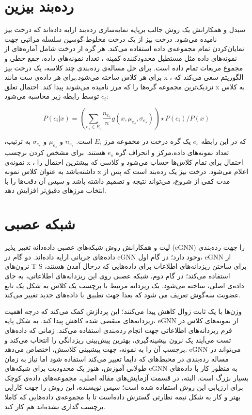 \section{رده‌بند بیزین}

سیدل
و همکارانش \cite{seidl2009indexing} یک روش جالب برپایه نمایه‌سازی
رده‌بند ارایه داده‌اند که درخت بیز نامیده می‌شود. درخت بیز از یک درخت مخلوط-گوسین سلسله مراتبی
جهت نمایان‌کردن تمام مجموعه‌ی داده استفاده می‌کند. هر گره از درخت شامل آماره‌های از نمونه‌های داده مثل مستطیل محدود‌کننده کمینه
، تعداد نمونه‌های داده، جمع خطی و مجموع مربعات تمام داده است.
برای حل مساله‌ی رده‌بندی چند کلاسه، یک درخت بیز برای هر کلاس ساخته‌ می‌شود.برای هر داده‌ی ست مانند x    ، الگوریتم سعی می‌کند که نزدیک‌ترین مجموعه گره‌ها را که مرز نامیده می‌شوند پیدا کند. احتمال تعلق x به کلاس $c_i$ توسط رابطه زیر محاسبه می‌شود:

$$
P(c_i | x ) = 
\left(       
\sum_{e_s \in E_i} \frac{n_{e_s}}{n}
g(x, \mu_{e_s}, \sigma_{e_s})
\right)
\star P(c_i)/P(x)
$$


که در این رابطه $e_s$ یک گره درخت در مخموعه مرز $E_i$ است. $n_{e_s}$ و $ \mu_{e_s}$ و $\sigma_{e_s}$ به ترتیب، تعداد نمونه‌های داده،‌مرکز و انحراف گره $e_s$ هستند. برای مشخص کردن برچسب نمونه‌ی x ، احتمال برای تمام کلاس‌ها حساب می‌شود و کلاسی که بیشترین احتمال را داشته‌باشد به عنوان کلاس نمونه x اعلام می‌شود. درخت بیز یک رده‌بند است که پس از مدت کمی از شروع، می‌تواند نتیجه و تصمیم داشته باشد و سپس آن دقت‌ها را با انتخاب مرز‌های دقیق‌تر افزایش دهد.


\section{شبکه عصبی}
لیت
و همکارانش \cite{leite2010evolving} روش شبکه‌های عصبی داده‌دانه تغییر پذیر
(eGNN)
را جهت رده‌بندی داده‌های جریانی ارایه داده‌اند. دو گام در eGNN وجود دارد؛ در گام اول، eGNN از نرون‌های T-S برای ساختن ریزدانه‌های اطلاعات برای داده‌هایی که درحال آمدن هستند، استفاده می‌کند؛ در گام دوم، شبکه عصبی روی این ریزدانه‌های اطلاعاتی، به جای داده‌ی اصلی، ساخته می‌شود. یک ریزدانه مرتبط با برچسب یک کلاس به شکل یک تابع عضویت سه‌گوش
 تعریف می شود که بعدا جهت تطبیق با داده‌های جدید تغییر می‌کند.
 
  وزن‌ها با یک ثابت زوال
کاهش پیدا می‌کنند؛ این پردازش کمک می‌کند که درجه اهمیت ریزدانه‌های منقضی شده کاهش پیدا کند. به شکل پایه، eGNN از نمونه‌های کلاس در فرم ریزدانه‌های اطلاعاتی جهت انجام رده‌بندی استفاده می‌کند. زمانی که داده‌های تست می‌آیند یک نرون بیشینه‌گیری، بهترین پیش‌بینی ریزدانگی را انتخاب می‌کند و برچسب آن را به نمونه، جهت پیشبینی کلاسش، اختصاص می‌دهد. eGNN می‌تواند در مساله رده‌بندی در محیط‌های که دایما تغییر می‌کند استفاده شود اما نیاز به زمان طولانی آموزش، هنوز یک محدودیت برای شبکه‌های eGNN به منظور کار با داده‌های بسیار بزرگ است. البته، در قسمت آزمایش‌های مقاله اصلی، مجموعه‌های داده‌ی کوچک برای ارزیابی این روش استفاده شده است؛ سپس نویسنده، این روش‌ را جهت کارایی بهتر و کار به شکل نیمه نظارتی  گسترش داده‌است تا با مجموعه‌ی داده‌هایی که کاملا برچسب گذاری نشده‌اند هم کار کند. 

